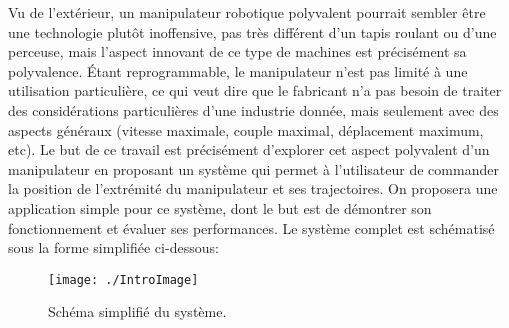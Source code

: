 

Vu de l’extérieur, un manipulateur robotique polyvalent pourrait sembler être une technologie plutôt inoffensive, pas très différent d’un tapis roulant ou d’une perceuse, mais l’aspect innovant de ce type de machines est précisément sa polyvalence. Étant reprogrammable, le manipulateur n’est pas limité à une utilisation particulière, ce qui veut dire que le fabricant n’a pas besoin de traiter des considérations particulières d’une industrie donnée, mais seulement avec des aspects généraux (vitesse maximale, couple maximal, déplacement maximum, etc). Le but de ce travail est précisément d’explorer cet aspect polyvalent d’un manipulateur en proposant un système qui permet à l’utilisateur de commander la position de l’extrémité du manipulateur et ses trajectoires. On proposera une application simple pour ce système, dont le but est de démontrer son fonctionnement et évaluer ses performances. Le système complet est schématisé sous la
forme simplifiée ci-dessous: 

\begin{figure}[H]
	\begin{center}	
		\texttt{[image: ./IntroImage]}
		\caption{Schéma simplifié du système.}
		\label{fig:Schema}
	\end{center}
\end{figure}